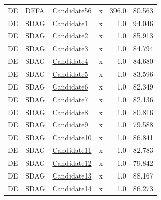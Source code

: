 \documentclass{article}
\begin{document}
\begin{longtable}{llllrr}
DE&DFFA &\href{C:/Users/hootanz/eclipse-workspace/processICPM/20251209_215703/DFFA/DE/candidate56.dffa}{Candidate56} & x &396.0&80.563\\
DE&SDAG &\href{C:/Users/hootanz/eclipse-workspace/processICPM/20251209_215703/SDAG/DE/candidate1.sdag}{Candidate1} & x &1.0&94.046\\
DE&SDAG &\href{C:/Users/hootanz/eclipse-workspace/processICPM/20251209_215703/SDAG/DE/candidate2.sdag}{Candidate2} & x &1.0&85.913\\
DE&SDAG &\href{C:/Users/hootanz/eclipse-workspace/processICPM/20251209_215703/SDAG/DE/candidate3.sdag}{Candidate3} & x &1.0&84.794\\
DE&SDAG &\href{C:/Users/hootanz/eclipse-workspace/processICPM/20251209_215703/SDAG/DE/candidate4.sdag}{Candidate4} & x &1.0&84.680\\
DE&SDAG &\href{C:/Users/hootanz/eclipse-workspace/processICPM/20251209_215703/SDAG/DE/candidate5.sdag}{Candidate5} & x &1.0&83.596\\
DE&SDAG &\href{C:/Users/hootanz/eclipse-workspace/processICPM/20251209_215703/SDAG/DE/candidate6.sdag}{Candidate6} & x &1.0&82.349\\
DE&SDAG &\href{C:/Users/hootanz/eclipse-workspace/processICPM/20251209_215703/SDAG/DE/candidate7.sdag}{Candidate7} & x &1.0&82.136\\
DE&SDAG &\href{C:/Users/hootanz/eclipse-workspace/processICPM/20251209_215703/SDAG/DE/candidate8.sdag}{Candidate8} & x &1.0&80.816\\
DE&SDAG &\href{C:/Users/hootanz/eclipse-workspace/processICPM/20251209_215703/SDAG/DE/candidate9.sdag}{Candidate9} & x &1.0&79.588\\
DE&SDAG &\href{C:/Users/hootanz/eclipse-workspace/processICPM/20251209_215703/SDAG/DE/candidate10.sdag}{Candidate10} & x &1.0&86.841\\
DE&SDAG &\href{C:/Users/hootanz/eclipse-workspace/processICPM/20251209_215703/SDAG/DE/candidate11.sdag}{Candidate11} & x &1.0&82.783\\
DE&SDAG &\href{C:/Users/hootanz/eclipse-workspace/processICPM/20251209_215703/SDAG/DE/candidate12.sdag}{Candidate12} & x &1.0&79.842\\
DE&SDAG &\href{C:/Users/hootanz/eclipse-workspace/processICPM/20251209_215703/SDAG/DE/candidate13.sdag}{Candidate13} & x &1.0&88.167\\
DE&SDAG &\href{C:/Users/hootanz/eclipse-workspace/processICPM/20251209_215703/SDAG/DE/candidate14.sdag}{Candidate14} & x &1.0&86.273\\

\end{longtable}
\end{document}
